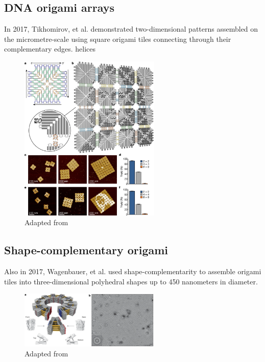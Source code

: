 \subsection{DNA origami arrays}\label{sec:origamiArrays}

In 2017, Tikhomirov, et al.\cite{tikhomirov2017fractal} demonstrated two-dimensional patterns assembled on the micrometre-scale using square origami tiles connecting through their complementary edges. helices

\begin{figure}[h]
  \centering\includegraphics[width=0.6\textwidth]{figures/monalisa_tiles.png}
  \caption{Adapted from \cite{tikhomirov2017fractal}}
\end{figure}

\subsection{Shape-complementary origami}


Also in 2017, Wagenbauer, et al. \cite{wagenbauer2017gigadalton} used shape-complementarity to assemble origami tiles into three-dimensional polyhedral shapes up to 450 nanometers in diameter.

\begin{figure}[h]
  \centering\includegraphics[width=0.6\textwidth]{figures/dietz_ring.png}
  \caption{Adapted from \cite{wagenbauer2017gigadalton}}
\end{figure}

